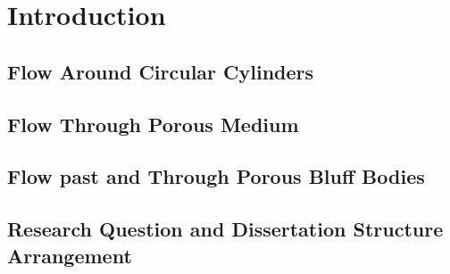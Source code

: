 \chapter{Introduction}
\section{Flow Around Circular Cylinders}
\section{Flow Through Porous Medium}
\section{Flow past and Through Porous Bluff Bodies}
\section{Research Question and Dissertation Structure Arrangement}
